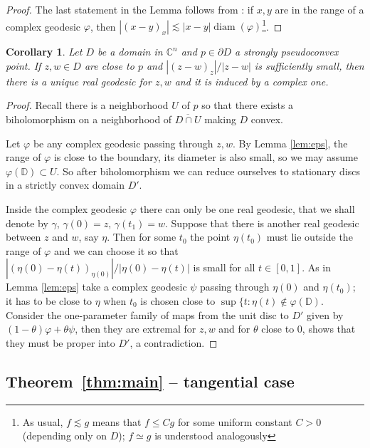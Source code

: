 \documentclass[a4paper,12pt]{amsart}
\def\diam{\operatorname{diam}}
\newtheorem{corollary}[theorem]{Corollary}
\theoremstyle{remark}\newtheorem{remark}[theorem]{Remark}
\begin{document}
\begin{proof}
The last statement in the Lemma follows from \cite[Theorem~3]{KN}: if $x,y$ are in the range of a complex geodesic $\varphi$, then $|(x-y)_x|\lesssim |x-y| \diam (\varphi)$\footnote{As usual, $f\lesssim g$ means that $f\le Cg$ for some uniform constant $C>0$ (depending only on $D$); $f\simeq g$ is understood analogously}.
\end{proof}


\begin{corollary}\label{lem:uni}
Let $D$ be a domain in $\mathbb C^n$ and $p\in \partial D$ a strongly
pseudoconvex point. If $z,w\in D$ are close to $p$ and $|(z-w)_z|/|z-w|$ is sufficiently small, then there is a unique real geodesic for $z,w$ and it is induced by a complex one.
\end{corollary}

\begin{proof} 
Recall there is a neighborhood $U$ of $p$ so that there exists
a biholomorphism on a neighborhood of $\overline{D\cap U}$ making $D$
convex.

Let $\varphi$ be any complex geodesic passing through $z,w$. By Lemma
\ref{lem:eps}, the range of $\varphi$ is close to the boundary, its diameter is also small, so we
may assume $\varphi(\mathbb D)\subset U$. 
So after biholomorphism we can reduce ourselves
to stationary discs in a strictly convex domain $D'$.

Inside the complex geodesic $\varphi$ there can only be one real geodesic, that we shall denote  by $\gamma$, $\gamma(0)=z$, $\gamma(t_1) = w$. Suppose that there is another real geodesic between $z$ and $w$, say $\eta$. Then for some $t_0$ the point $\eta(t_0)$ must lie outside the range of $\varphi$ and
we can choose it so that $|(\eta(0)-\eta(t))_{\eta(0)}|/|\eta(0)-\eta(t)|$ 
is small for all $t\in[0,1]$. As in Lemma \ref{lem:eps} take a complex geodesic $\psi$ passing through $\eta(0)$ and $\eta(t_0)$;
it has to be close to $\eta$ when $t_0$ is chosen close to $\sup\{t: \eta(t)\notin \varphi(\mathbb D)$. 
Consider the one-parameter family of maps from the unit disc to $D'$ given by $(1-\theta)\varphi + \theta \psi$, then
they are extremal for $z,w$ and
for $\theta$ close to $0$,  \cite[Lemma 3.2]{KZ} shows that they must be proper into $D'$, a contradiction.
\end{proof}




\subsection{Theorem~\ref{thm:main} -- tangential case}
\end{document}
